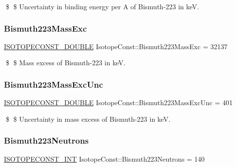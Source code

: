 \$ \$ Uncertainty in binding energy per A of Bismuth-\/223 in keV. \mbox{\label{group___isotope_const-_bismuth-_bi223_ga2f710bc13e27e33450927b7591de47b6}} 
\subsubsection{\texorpdfstring{Bismuth223\+Mass\+Exc}{Bismuth223MassExc}}
{\footnotesize\ttfamily \mbox{\hyperlink{group___isotope_const-_macros_ga8f45a7272ce02c0b4c65c44636ed719a}{I\+S\+O\+T\+O\+P\+E\+C\+O\+N\+S\+T\+\_\+\+D\+O\+U\+B\+LE}} Isotope\+Const\+::\+Bismuth223\+Mass\+Exc = 32137}

\$ \$ Mass excess of Bismuth-\/223 in keV. \mbox{\label{group___isotope_const-_bismuth-_bi223_ga71640600c58e01d36e4a25eb86675c58}} 
\subsubsection{\texorpdfstring{Bismuth223\+Mass\+Exc\+Unc}{Bismuth223MassExcUnc}}
{\footnotesize\ttfamily \mbox{\hyperlink{group___isotope_const-_macros_ga8f45a7272ce02c0b4c65c44636ed719a}{I\+S\+O\+T\+O\+P\+E\+C\+O\+N\+S\+T\+\_\+\+D\+O\+U\+B\+LE}} Isotope\+Const\+::\+Bismuth223\+Mass\+Exc\+Unc = 401}

\$ \$ Uncertainty in mass excess of Bismuth-\/223 in keV. \mbox{\label{group___isotope_const-_bismuth-_bi223_ga315512d67fd3c13c873bedfd7e6642ca}} 
\subsubsection{\texorpdfstring{Bismuth223\+Neutrons}{Bismuth223Neutrons}}
{\footnotesize\ttfamily \mbox{\hyperlink{group___isotope_const-_macros_ga5f18360b3e99483a35c32d789e62621c}{I\+S\+O\+T\+O\+P\+E\+C\+O\+N\+S\+T\+\_\+\+I\+NT}} Isotope\+Const\+::\+Bismuth223\+Neutrons = 140}

